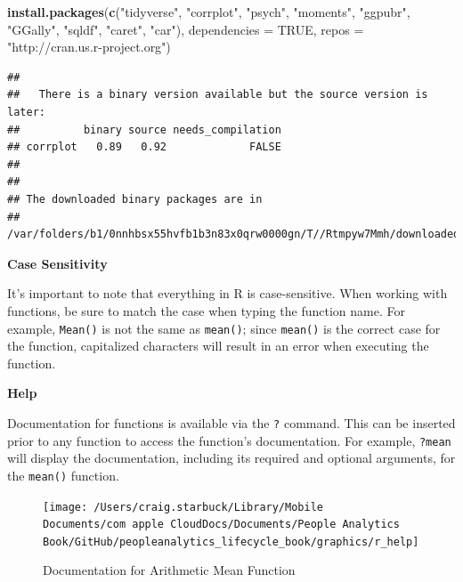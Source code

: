 \documentclass[]{book}
\newenvironment{Shaded}{\begin{snugshade}}{\end{snugshade}}
\newcommand{\DataTypeTok}[1]{\textcolor[rgb]{0.13,0.29,0.53}{#1}}
\newcommand{\KeywordTok}[1]{\textcolor[rgb]{0.13,0.29,0.53}{\textbf{#1}}}
\newcommand{\NormalTok}[1]{#1}
\newcommand{\OtherTok}[1]{\textcolor[rgb]{0.56,0.35,0.01}{#1}}
\newcommand{\StringTok}[1]{\textcolor[rgb]{0.31,0.60,0.02}{#1}}
\begin{document}
\begin{Shaded}
\begin{Highlighting}[]
\KeywordTok{install.packages}\NormalTok{(}\KeywordTok{c}\NormalTok{(}\StringTok{"tidyverse"}\NormalTok{, }\StringTok{"corrplot"}\NormalTok{, }\StringTok{"psych"}\NormalTok{, }\StringTok{"moments"}\NormalTok{, }\StringTok{"ggpubr"}\NormalTok{, }\StringTok{"GGally"}\NormalTok{, }\StringTok{"sqldf"}\NormalTok{, }\StringTok{"caret"}\NormalTok{, }\StringTok{"car"}\NormalTok{), }\DataTypeTok{dependencies =} \OtherTok{TRUE}\NormalTok{, }\DataTypeTok{repos =} \StringTok{"http://cran.us.r-project.org"}\NormalTok{)}
\end{Highlighting}
\end{Shaded}

\begin{verbatim}
## 
##   There is a binary version available but the source version is later:
##          binary source needs_compilation
## corrplot   0.89   0.92             FALSE
## 
## 
## The downloaded binary packages are in
##  /var/folders/b1/0nnhbsx55hvfb1b3n83x0qrw0000gn/T//Rtmpyw7Mmh/downloaded_packages
\end{verbatim}

\textbf{Case Sensitivity}

It's important to note that everything in R is case-sensitive. When working with functions, be sure to match the case when typing the function name. For example, \texttt{Mean()} is not the same as \texttt{mean()}; since \texttt{mean()} is the correct case for the function, capitalized characters will result in an error when executing the function.

\textbf{Help}

Documentation for functions is available via the \texttt{?} command. This can be inserted prior to any function to access the function's documentation. For example, \texttt{?mean} will display the documentation, including its required and optional arguments, for the \texttt{mean()} function.

\begin{figure}

{\centering \texttt{[image: /Users/craig.starbuck/Library/Mobile Documents/com~apple~CloudDocs/Documents/People Analytics Book/GitHub/peopleanalytics\_lifecycle\_book/graphics/r\_help]} 

}

\caption{Documentation for Arithmetic Mean Function}\label{fig:r-help}
\end{figure}
\end{document}
